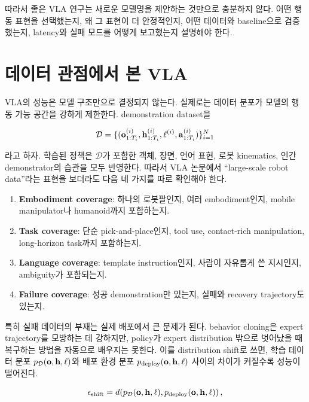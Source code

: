 따라서 좋은 VLA 연구는 새로운 모델명을 제안하는 것만으로 충분하지 않다. 어떤 행동 표현을 선택했는지, 왜 그 표현이 더 안정적인지, 어떤 데이터와 baseline으로 검증했는지, latency와 실패 모드를 어떻게 보고했는지 설명해야 한다.

\section{데이터 관점에서 본 VLA}

VLA의 성능은 모델 구조만으로 결정되지 않는다. 실제로는 데이터 분포가 모델의 행동 가능 공간을 강하게 제한한다. demonstration dataset을

\begin{equation}
  \mathcal{D}
  =
  \{(\mathbf{o}^{(i)}_{1:T_i}, \mathbf{h}^{(i)}_{1:T_i}, \ell^{(i)}, \mathbf{a}^{(i)}_{1:T_i})\}_{i=1}^{N}
\end{equation}

라고 하자. 학습된 정책은 $\mathcal{D}$가 포함한 객체, 장면, 언어 표현, 로봇 kinematics, 인간 demonstrator의 습관을 모두 반영한다. 따라서 VLA 논문에서 ``large-scale robot data''라는 표현을 보더라도 다음 네 가지를 따로 확인해야 한다.

\begin{enumerate}
  \item \textbf{Embodiment coverage}: 하나의 로봇팔인지, 여러 embodiment인지, mobile manipulator나 humanoid까지 포함하는지.
  \item \textbf{Task coverage}: 단순 pick-and-place인지, tool use, contact-rich manipulation, long-horizon task까지 포함하는지.
  \item \textbf{Language coverage}: template instruction인지, 사람이 자유롭게 쓴 지시인지, ambiguity가 포함되는지.
  \item \textbf{Failure coverage}: 성공 demonstration만 있는지, 실패와 recovery trajectory도 있는지.
\end{enumerate}

특히 실패 데이터의 부재는 실제 배포에서 큰 문제가 된다. behavior cloning은 expert trajectory를 모방하는 데 강하지만, policy가 expert distribution 밖으로 벗어났을 때 복구하는 방법을 자동으로 배우지는 못한다. 이를 distribution shift로 쓰면, 학습 데이터 분포 $p_{\mathcal{D}}(\mathbf{o},\mathbf{h},\ell)$와 배포 환경 분포 $p_{\mathrm{deploy}}(\mathbf{o},\mathbf{h},\ell)$ 사이의 차이가 커질수록 성능이 떨어진다.

\begin{equation}
  \epsilon_{\mathrm{shift}}
  =
  d\!\left(
  p_{\mathcal{D}}(\mathbf{o},\mathbf{h},\ell),
  p_{\mathrm{deploy}}(\mathbf{o},\mathbf{h},\ell)
  \right),
\end{equation}

